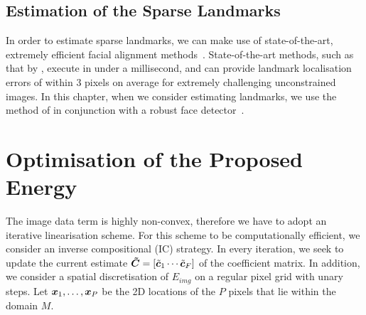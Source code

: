 \subsection{Estimation of the Sparse Landmarks}
In order to estimate sparse landmarks, we can make use of state-of-the-art, extremely
efficient facial alignment methods~\cite{kazemi2014one,asthana2014incremental,%
menpo14,alabort2014bayesian}.
State-of-the-art methods, such as that by \citet{kazemi2014one},
execute in under a millisecond, and can provide landmark localisation errors
of within $3$ pixels on average for extremely challenging unconstrained images.
In this chapter, when we consider estimating landmarks, we use the method of
\citet{kazemi2014one} in conjunction with a robust face detector~\cite{zafeiriou2015survey}.
\section{Optimisation of the Proposed Energy}
The image data term is highly non-convex, therefore we have to adopt an iterative
linearisation scheme. For this scheme to be computationally efficient, we consider
an inverse compositional (IC) strategy. In every iteration, we seek to update the
current estimate $\boldsymbol{\tilde{C}}= [\tilde{\boldsymbol{c}}_1 \cdots \tilde{\boldsymbol{c}}_F]$ of the
coefficient matrix. In addition, we consider a spatial discretisation of $E_{img}$
on a regular pixel grid with unary steps. Let $\boldsymbol{x}_1,\ldots,\boldsymbol{x}_P$ be the 2D
locations of the $P$ pixels that lie within the domain $M$.

